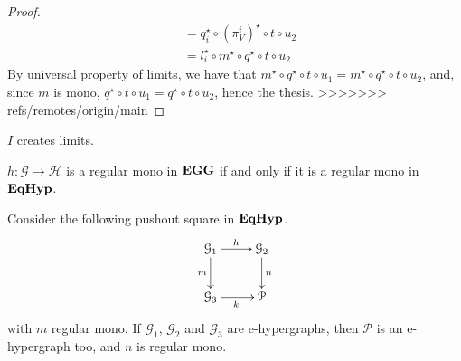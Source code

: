 \begin{proof}
\begin{align*}
                                                        &= q_i^\star \circ (\pi_V^i)^\star \circ t \circ u_2 \\
                                                        &= l_i^\star \circ m^\star \circ q^\star \circ t \circ u_2
        \end{align*}
        By universal property of limits, we have that \- $m^\star\circ q^\star \circ t \circ u_1 = m^\star \circ q^\star \circ t \circ u_2$, and, since $m$ is mono, $q^\star \circ t \circ u_1 = q^\star \circ t \circ u_2$, hence the thesis.
>>>>>>> refs/remotes/origin/main
\end{proof}

\begin{corollary}
	$I$ creates limits.
\end{corollary}

\begin{corollary}
	$h: \mathcal{G \to H}$ is a regular mono in $\textbf{\textup{EGG}}$ if and only if it is a regular mono in $\textbf{\textup{EqHyp}}$.
\end{corollary}

\begin{lemma}
	Consider the following pushout square in $\textbf{\textup{EqHyp}}$.
	\[\xymatrix{\mathcal{G}_1 \ar[r]^{h}\ar[d]_{m}&\mathcal{G}_2\ar[d]^{n}\\\mathcal{G}_3\ar[r]_{k}&\mathcal{P}}\]
with $m$ regular mono. If $\mathcal{G}_1$, $\mathcal{G}_2$ and $\mathcal{G}_3$ are e-hypergraphs, then $\mathcal{P}$ is an e-hypergraph too, and $n$ is regular mono.
\end{lemma}

